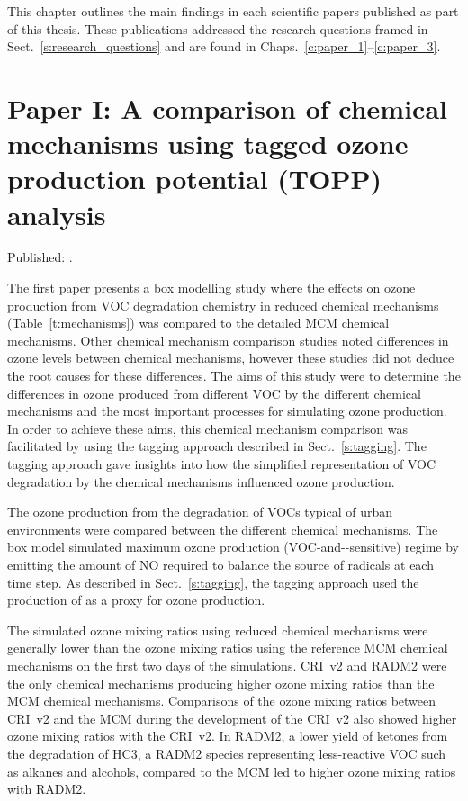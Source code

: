 This chapter outlines the main findings in each scientific papers published as part of this thesis.
These publications addressed the research questions framed in Sect.~\ref{s:research_questions} and are found in Chaps.~\ref{c:paper_1}--\ref{c:paper_3}.

\singlespacing
\section[Paper I]{Paper I: A comparison of chemical mechanisms using tagged ozone production potential (TOPP) analysis} \label{s:chemical_mechanism_results}
\onehalfspacing

Published: .
\vspace{5mm}

The first paper presents a box modelling study where the effects on ozone production from VOC degradation chemistry in reduced chemical mechanisms (Table~\ref{t:mechanisms}) was compared to the detailed MCM chemical mechanisms.
Other chemical mechanism comparison studies noted differences in ozone levels between chemical mechanisms, however these studies did not deduce the root causes for these differences.
The aims of this study were to determine the differences in ozone produced from different VOC by the different chemical mechanisms and the most important processes for simulating ozone production.
In order to achieve these aims, this chemical mechanism comparison was facilitated by using the tagging approach described in Sect.~\ref{s:tagging}.
The tagging approach gave insights into how the simplified representation of VOC degradation by the chemical mechanisms influenced ozone production.

The ozone production from the degradation of VOCs typical of urban environments were compared between the different chemical mechanisms.
The box model simulated maximum ozone production (VOC-and--sensitive) regime by emitting the amount of NO required to balance the source of radicals at each time step.
As described in Sect.~\ref{s:tagging}, the tagging approach used the production of  as a proxy for ozone production.

The simulated ozone mixing ratios using reduced chemical mechanisms were generally lower than the ozone mixing ratios using the reference MCM chemical mechanisms on the first two days of the simulations.
CRI~v2 and RADM2 were the only chemical mechanisms producing higher ozone mixing ratios than the MCM chemical mechanisms.
Comparisons of the ozone mixing ratios between CRI~v2 and the MCM during the development of the CRI~v2 also showed higher ozone mixing ratios with the CRI~v2.
In RADM2, a lower yield of ketones from the degradation of HC3, a RADM2 species representing less-reactive VOC such as alkanes and alcohols, compared to the MCM led to higher ozone mixing ratios with RADM2.

